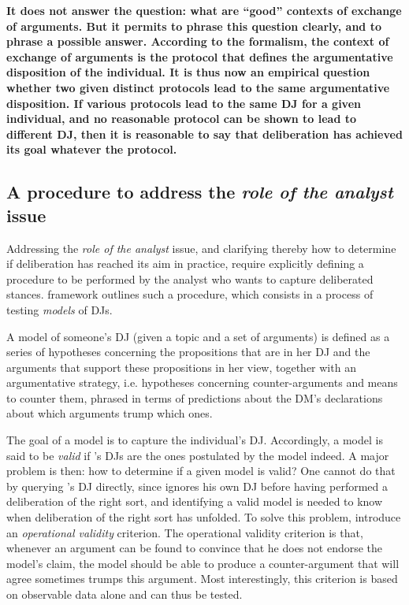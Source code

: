\documentclass[version=3.21, pagesize, twoside=off, bibliography=totoc, DIV=calc, fontsize=12pt, a4paper, french, english]{scrartcl}
\begin{document}
\textbf{It does not answer the question: what are “good” contexts of exchange of arguments. But it permits to phrase this question clearly, and to phrase a possible answer. According to the formalism, the context of exchange of arguments is the protocol that defines the argumentative disposition of the individual. It is thus now an empirical question whether two given distinct protocols lead to the same argumentative disposition. If various protocols lead to the same \ac{DJ} for a given individual, and no reasonable protocol can be shown to lead to different \ac{DJ}, then it is reasonable to say that deliberation has achieved its goal whatever the protocol.}


\subsection{A procedure to address the \emph{role of the analyst} issue}
Addressing the \emph{role of the analyst} issue, and clarifying thereby how to determine if deliberation has reached its aim in practice, require explicitly defining a procedure to be performed by the analyst who wants to capture deliberated stances.  framework outlines such a procedure, which consists in a process of testing \emph{models} of \acp{DJ}. 

A model of someone’s \ac{DJ} (given a topic and a set of arguments) is defined as a series of hypotheses concerning the propositions that are in her \ac{DJ} and the arguments that support these propositions in her view, together with an argumentative strategy, i.e. hypotheses concerning counter-arguments and means to counter them, phrased in terms of predictions about the \ac{DM}’s declarations about which arguments trump which ones.

The goal of a model is to capture the individual’s \ac{DJ}. Accordingly, a model is said to be \emph{valid} if \thedm’s \acp{DJ} are the ones postulated by the model indeed. A major problem is then: how to determine if a given model is valid?
One cannot do that by querying \thedm’s \ac{DJ} directly, since \thedm{} ignores his own \ac{DJ} before having performed a deliberation of the right sort, and identifying a valid model is needed to know when deliberation of the right sort has unfolded. To solve this problem, \citet{cailloux_formal_2019} introduce an \emph{operational validity} criterion.
The operational validity criterion is that, whenever an argument can be found to convince \thedm{} that he does not endorse the model’s claim, the model should be able to produce a counter-argument that \thedm{} will agree sometimes trumps this argument. 
Most interestingly, this criterion is based on observable data alone and can thus be tested.
\end{document}
